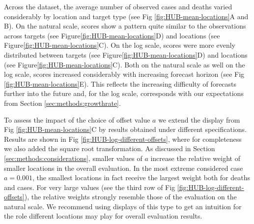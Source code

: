 \documentclass[10pt,letterpaper]{article}
\begin{document}
Across the dataset, the average number of observed cases and deaths varied considerably by location and target type (see Fig \ref{fig:HUB-mean-locations}A and B). On the natural scale, scores show a pattern quite similar to the observations across targets (see Figure\ref{fig:HUB-mean-locations}D) and locations (see Figure\ref{fig:HUB-mean-locations}C). On the log scale, scores were more evenly distributed between targets (see Figure\ref{fig:HUB-mean-locations}D) and locations (see Figure\ref{fig:HUB-mean-locations}C). Both on the natural scale as well on the log scale, scores increased considerably with increasing forecast horizon (see Fig \ref{fig:HUB-mean-locations}E). This reflects the increasing difficulty of forecasts further into the future and, for the log scale, corresponds with our expectations from Section \ref{sec:methods:growthrate}. 

To assess the impact of the choice of offset value $a$ we extend the display from Fig \ref{fig:HUB-mean-locations}C by results obtained under different specifications. Results are shown in Fig \ref{fig:HUB-log-different-offsets}, where for completeness we also added the square root transformation. As discussed in Section \ref{sec:methods:considerations}, smaller values of $a$ increase the relative weight of smaller locations in the overall evaluation. In the most extreme considered case $a = 0.001$, the smallest locations in fact receive the largest weight both for deaths and cases. For very large values (see the third row of Fig \ref{fig:HUB-log-different-offsets}), the relative weights strongly resemble those of the evaluation on the natural scale. We recommend using displays of this type to get an intuition for the role different locations may play for overall evaluation results.
\end{document}
